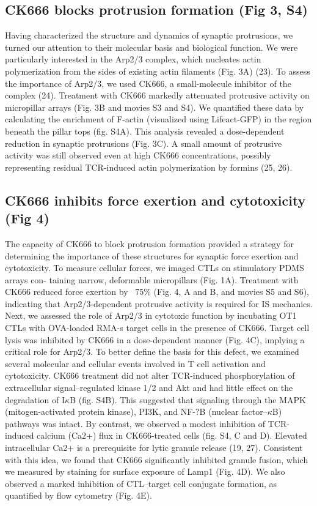 \subsection{CK666 blocks protrusion formation (Fig 3, S4)}

Having characterized the structure and dynamics of synaptic protrusions, we turned our attention to their molecular basis and biological function. We were particularly interested in the Arp2/3 complex, which nucleates actin polymerization from the sides of existing actin filaments (Fig. 3A) (23). To assess the importance of Arp2/3, we used CK666, a small-molecule inhibitor of the complex (24). Treatment with CK666 markedly attenuated protrusive activity on micropillar arrays (Fig. 3B and movies S3 and S4). We quantified these data by calculating the enrichment of F-actin (visualized using Lifeact-GFP) in the region beneath the pillar tops (fig. S4A). This analysis revealed a dose-dependent reduction in synaptic protrusions (Fig. 3C). A small amount of protrusive activity was still observed even at high CK666 concentrations, possibly representing residual TCR-induced actin polymerization by formins (25, 26).

\subsection{CK666 inhibits force exertion and cytotoxicity (Fig 4)}

The capacity of CK666 to block protrusion formation provided a strategy for determining the importance of these structures for synaptic force exertion and cytotoxicity. To measure cellular forces, we imaged CTLs on stimulatory PDMS arrays con- taining narrow, deformable micropillars (Fig. 1A). Treatment with CK666 reduced force exertion by ~75\% (Fig. 4, A and B, and movies S5 and S6), indicating that Arp2/3-dependent protrusive activity is required for IS mechanics. Next, we assessed the role of Arp2/3 in cytotoxic function by incubating OT1 CTLs with OVA-loaded RMA-s target cells in the presence of CK666. Target cell lysis was inhibited by CK666 in a dose-dependent manner (Fig. 4C), implying a critical role for Arp2/3. To better define the basis for this defect, we examined several molecular and cellular events involved in T cell activation and cytotoxicity. CK666 treatment did not alter TCR-induced phosphorylation of extracellular signal–regulated kinase 1/2 and Akt and had little effect on the degradation of I$\kappa$B (fig. S4B). This suggested that signaling through the MAPK (mitogen-activated protein kinase), PI3K, and NF-?B (nuclear factor–$\kappa$B) pathways was intact. By contrast, we observed a modest inhibition of TCR-induced calcium (Ca2+) flux in CK666-treated cells (fig. S4, C and D). Elevated intracellular Ca2+ is a prerequisite for lytic granule release (19, 27). Consistent with this idea, we found that CK666 significantly inhibited granule fusion, which we measured by staining for surface exposure of Lamp1 (Fig. 4D). We also observed a marked inhibition of CTL–target cell conjugate formation, as quantified by flow cytometry (Fig. 4E).

